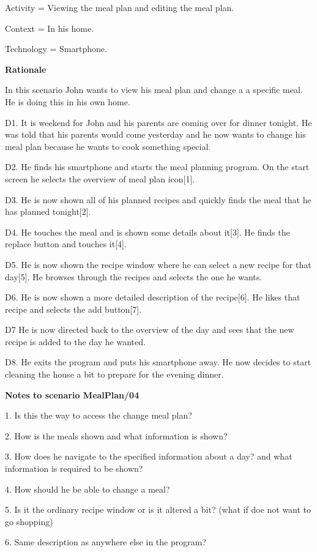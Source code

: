 	Activity = Viewing the meal plan and editing the meal plan.
	
	Context = In his home. 
	
	Technology = Smartphone.
	
\textbf{Rationale}

In this scenario John wants to view his meal plan and change a a specific meal. He is doing this in his own home.

	D1. It is weekend for John and his parents are coming over for dinner tonight. He was told that his parents would come yesterday and he now wants to change his meal plan because he wants to cook something special.
	
	D2. He finds his smartphone and starts the meal planning program. On the start screen he selects the overview of meal plan icon[1].
	
	D3. He is now shown all of his planned recipes and quickly finds the meal that he has planned tonight[2].
	
	D4. He touches the meal and is shown some details about it[3]. He finds the replace button and touches it[4].
	
	D5. He is now shown the recipe window where he can select a new recipe for that day[5]. He browses through the recipes and selects the one he wants. 
	
	D6. He is now shown a more detailed description of the recipe[6]. He likes that recipe and selects the add button[7].
	
	D7 He is now directed back to the overview of the day and sees that the new recipe is added to the day he wanted.
	
	D8. He exits the program and puts his smartphone away. He now decides to start cleaning the house a bit to prepare for the evening dinner.
	
\textbf{Notes to scenario MealPlan/04}

1. Is this the way to access the change meal plan?

2. How is the meals shown and what information is shown? 

3. How does he navigate to the specified information about a day? and what information is required to be shown?

4. How should he be able to change a meal?

5. Is it the ordinary recipe window or is it altered a bit? (what if doe not want to go shopping) 

6. Same description as anywhere else in the program?

